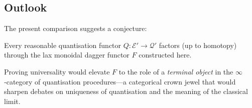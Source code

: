 \subsection{Outlook}
The present comparison suggests a conjecture:

\begin{conjecture}[Universality]
Every reasonable quantisation functor
\( Q\colon\mathcal E'\to\mathcal Q' \)
factors (up to homotopy) through the lax monoidal dagger functor
\(F\) constructed here.
\end{conjecture}

Proving universality would elevate $F$ to the role of a
\emph{terminal object} in the $\infty$‑category of quantisation
procedures—a categorical crown jewel that would sharpen debates on
uniqueness of quantisation and the meaning of the classical limit.